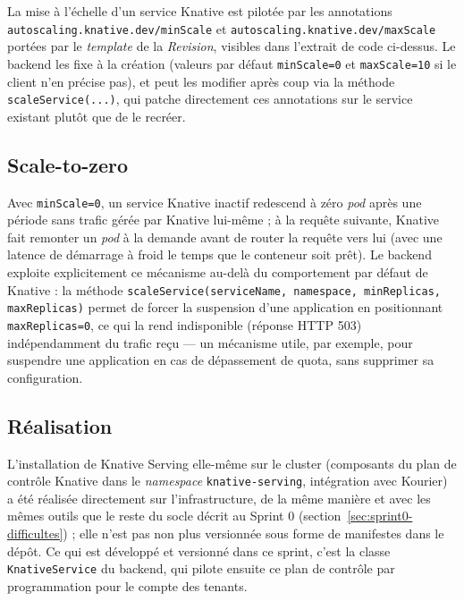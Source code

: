 La mise à l'échelle d'un service Knative est pilotée par les annotations \texttt{autoscaling.knative.dev/minScale} et \texttt{autoscaling.knative.dev/maxScale} portées par le \textit{template} de la \textit{Revision}, visibles dans l'extrait de code ci-dessus. Le backend les fixe à la création (valeurs par défaut \texttt{minScale=0} et \texttt{maxScale=10} si le client n'en précise pas), et peut les modifier après coup via la méthode \texttt{scaleService(...)}, qui patche directement ces annotations sur le service existant plutôt que de le recréer.

\subsection{Scale-to-zero}

Avec \texttt{minScale=0}, un service Knative inactif redescend à zéro \textit{pod} après une période sans trafic gérée par Knative lui-même ; à la requête suivante, Knative fait remonter un \textit{pod} à la demande avant de router la requête vers lui (avec une latence de démarrage à froid le temps que le conteneur soit prêt). Le backend exploite explicitement ce mécanisme au-delà du comportement par défaut de Knative : la méthode \texttt{scaleService(serviceName, namespace, minReplicas, maxReplicas)} permet de forcer la suspension d'une application en positionnant \texttt{maxReplicas=0}, ce qui la rend indisponible (réponse HTTP 503) indépendamment du trafic reçu — un mécanisme utile, par exemple, pour suspendre une application en cas de dépassement de quota, sans supprimer sa configuration.


\subsection{Réalisation}

L'installation de Knative Serving elle-même sur le cluster (composants du plan de contrôle Knative dans le \textit{namespace} \texttt{knative-serving}, intégration avec Kourier) a été réalisée directement sur l'infrastructure, de la même manière et avec les mêmes outils que le reste du socle décrit au Sprint 0 (section~\ref{sec:sprint0-difficultes}) ; elle n'est pas non plus versionnée sous forme de manifestes dans le dépôt. Ce qui est développé et versionné dans ce sprint, c'est la classe \texttt{KnativeService} du backend, qui pilote ensuite ce plan de contrôle par programmation pour le compte des tenants.

